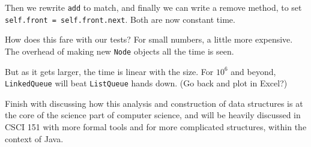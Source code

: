 \documentclass{article}
\begin{document}
Then we rewrite \verb|add| to match, and finally we can write a remove
method, to set \verb|self.front = self.front.next|.  Both are now
constant time.

How does this fare with our tests? For small numbers, a little more
expensive. The overhead of making new \verb|Node| objects all the time
is seen.

But as it gets larger, the time is linear with the size. For $10^6$
and beyond, \verb|LinkedQueue| will beat \verb|ListQueue| hands
down. (Go back and plot in Excel?)

Finish with discussing how this analysis and construction of data
structures is at the core of the science part of computer science, and will
be heavily discussed in CSCI 151 with more formal tools and for more
complicated structures, within the context of Java.
\end{document}
